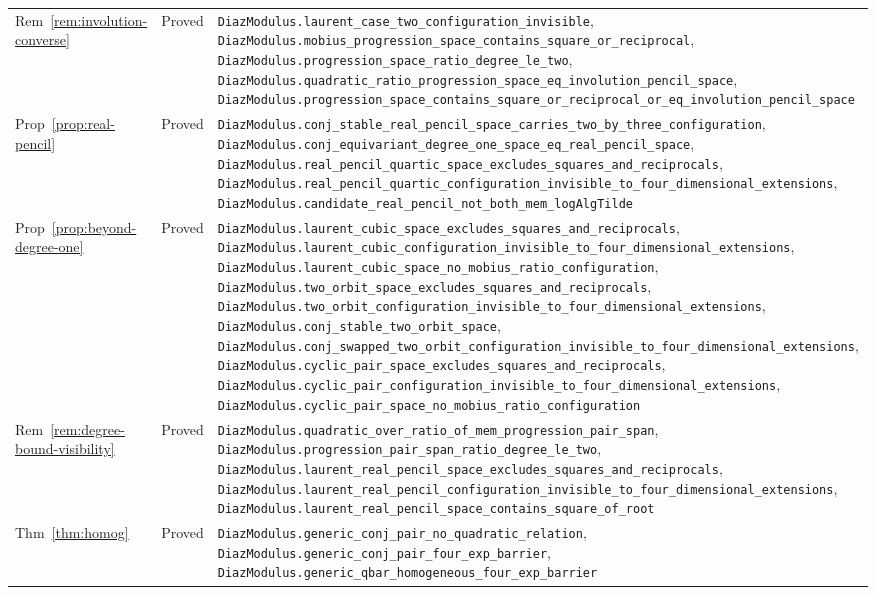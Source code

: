 \documentclass[11pt,a4paper]{article}
\theoremstyle{plain}
\theoremstyle{definition}
\begin{document}
\begin{center}
\begin{longtable}{@{}llp{6.2cm}@{}}
Rem~\ref{rem:involution-converse} & Proved & \nolinkurl{DiazModulus.laurent_case_two_configuration_invisible}, \nolinkurl{DiazModulus.mobius_progression_space_contains_square_or_reciprocal}, \nolinkurl{DiazModulus.progression_space_ratio_degree_le_two}, \nolinkurl{DiazModulus.quadratic_ratio_progression_space_eq_involution_pencil_space}, \nolinkurl{DiazModulus.progression_space_contains_square_or_reciprocal_or_eq_involution_pencil_space} \\
Prop~\ref{prop:real-pencil} & Proved & \nolinkurl{DiazModulus.conj_stable_real_pencil_space_carries_two_by_three_configuration}, \nolinkurl{DiazModulus.conj_equivariant_degree_one_space_eq_real_pencil_space}, \nolinkurl{DiazModulus.real_pencil_quartic_space_excludes_squares_and_reciprocals}, \nolinkurl{DiazModulus.real_pencil_quartic_configuration_invisible_to_four_dimensional_extensions}, \nolinkurl{DiazModulus.candidate_real_pencil_not_both_mem_logAlgTilde} \\
Prop~\ref{prop:beyond-degree-one} & Proved & \nolinkurl{DiazModulus.laurent_cubic_space_excludes_squares_and_reciprocals}, \nolinkurl{DiazModulus.laurent_cubic_configuration_invisible_to_four_dimensional_extensions}, \nolinkurl{DiazModulus.laurent_cubic_space_no_mobius_ratio_configuration}, \nolinkurl{DiazModulus.two_orbit_space_excludes_squares_and_reciprocals}, \nolinkurl{DiazModulus.two_orbit_configuration_invisible_to_four_dimensional_extensions}, \nolinkurl{DiazModulus.conj_stable_two_orbit_space}, \nolinkurl{DiazModulus.conj_swapped_two_orbit_configuration_invisible_to_four_dimensional_extensions}, \nolinkurl{DiazModulus.cyclic_pair_space_excludes_squares_and_reciprocals}, \nolinkurl{DiazModulus.cyclic_pair_configuration_invisible_to_four_dimensional_extensions}, \nolinkurl{DiazModulus.cyclic_pair_space_no_mobius_ratio_configuration} \\
Rem~\ref{rem:degree-bound-visibility} & Proved & \nolinkurl{DiazModulus.quadratic_over_ratio_of_mem_progression_pair_span}, \nolinkurl{DiazModulus.progression_pair_span_ratio_degree_le_two}, \nolinkurl{DiazModulus.laurent_real_pencil_space_excludes_squares_and_reciprocals}, \nolinkurl{DiazModulus.laurent_real_pencil_configuration_invisible_to_four_dimensional_extensions}, \nolinkurl{DiazModulus.laurent_real_pencil_space_contains_square_of_root} \\
Thm~\ref{thm:homog} & Proved & \nolinkurl{DiazModulus.generic_conj_pair_no_quadratic_relation}, \nolinkurl{DiazModulus.generic_conj_pair_four_exp_barrier}, \nolinkurl{DiazModulus.generic_qbar_homogeneous_four_exp_barrier} \\

\end{longtable}
\end{center}
\end{document}
